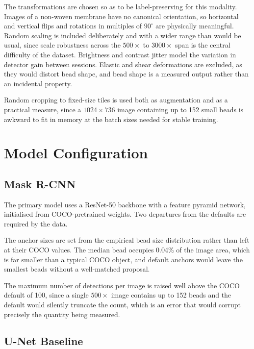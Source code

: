 The transformations are chosen so as to be label-preserving for this modality.
Images of a non-woven membrane have no canonical orientation, so horizontal and
vertical flips and rotations in multiples of $90^{\circ}$ are physically meaningful.
Random scaling is included deliberately and with a wider range than would be usual,
since scale robustness across the $500\times$ to $3000\times$ span is the central
difficulty of the dataset. Brightness and contrast jitter model the variation in
detector gain between sessions. Elastic and shear deformations are excluded, as they
would distort bead shape, and bead shape is a measured output rather than an
incidental property.

Random cropping to fixed-size tiles is used both as augmentation and as a practical
measure, since a $1024 \times 736$ image containing up to 152 small beads is
awkward to fit in memory at the batch sizes needed for stable training.

\section{Model Configuration}

\subsection{Mask R-CNN}

The primary model uses a ResNet-50 backbone with a feature pyramid network,
initialised from COCO-pretrained weights. Two departures from the defaults are
required by the data.

The anchor sizes are set from the empirical bead size distribution rather than left
at their COCO values. The median bead occupies 0.04\% of the image area, which is
far smaller than a typical COCO object, and default anchors would leave the smallest
beads without a well-matched proposal.

The maximum number of detections per image is raised well above the COCO default of
100, since a single $500\times$ image contains up to 152 beads and the default
would silently truncate the count, which is an error that would corrupt precisely
the quantity being measured.

\subsection{U-Net Baseline}

